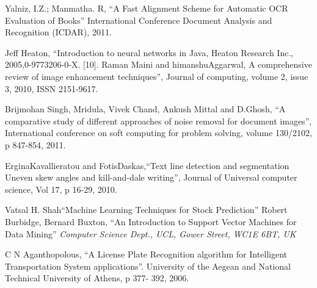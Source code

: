 \documentclass[12pt,a4paper,oneside]{report}
\newcommand{\quotes}[1]{``#1''}
\begin{document}
\renewcommand{\bibname}{Chapter 7\\\uppercase{REFERENCES}}
\begin{thebibliography}{999}

Yalniz, I.Z.; Manmatha. R,
\quotes{A Fast Alignment
Scheme for Automatic OCR Evaluation of Books}
International Conference Document Analysis and
Recognition (ICDAR), 2011.

  Jeff Heaton, \quotes{Introduction to neural networks in
Java, Heaton Research Inc., 2005,0-9773206-0-X.
[10]. Raman Maini and himanshuAggarwal, A
comprehensive review of image enhancement
techniques}, Journal of computing, volume 2, issue
3, 2010, ISSN 2151-9617.

 Brijmohan Singh, Mridula, Vivek Chand, Ankush
Mittal and D.Ghosh, \quotes{A comparative study of
different approaches of noise removal for document
images}, International conference on soft
computing for problem solving, volume 130/2102,
p 847-854, 2011.

  ErginaKavallieratou and FotisDaskas,\quotes{Text line
detection and segmentation Uneven skew angles
and kill-and-dale writing}, Journal of Universal
computer science, Vol 17, p 16-29, 2010.

 Vatsal H. Shah\quotes{Machine Learning Techniques for Stock Prediction} 
 Robert Burbidge, Bernard Buxton, \quotes{An Introduction to Support Vector Machines for Data
Mining}
\textit{Computer Science Dept., UCL, Gower Street, WC1E 6BT, UK}

C N Aganthopolous, \quotes {A License Plate Recognition
algorithm for Intelligent Transportation System
applications}. University of the Aegean and
National Technical University of Athens, p 377-
392, 2006.




\end{thebibliography}
\end{document}
